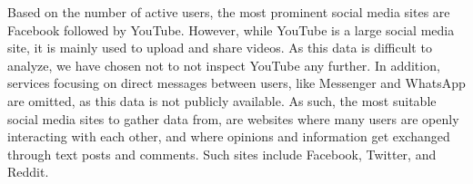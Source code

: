 Based on the number of active users, the most prominent social media sites are
Facebook followed by YouTube. However, while YouTube is a large social media
site, it is mainly used to upload and share videos. As this data is difficult to
analyze, we have chosen not to not inspect YouTube any further. In
addition, services focusing on direct messages between users, like Messenger and
WhatsApp are omitted, as this data is not publicly available. As such, the most
suitable social media sites to gather data from, are websites where many users
are openly interacting with each other, and where opinions and information get
exchanged through text posts and comments. Such sites include Facebook,
Twitter, and Reddit.\nl
